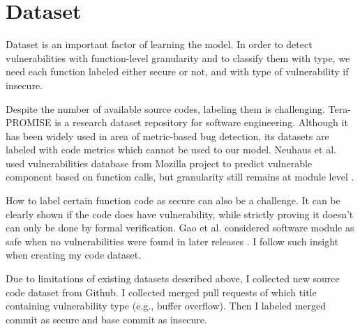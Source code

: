 \section{Dataset}
\label{section:dataset}

Dataset is an important factor of learning the model.
In order to detect vulnerabilities with function-level granularity and to classify them with type, we need each function labeled either secure or not, and with type of vulnerability if insecure.

Despite the number of available source codes, labeling them is challenging.
Tera-PROMISE \cite{promiserepo} is a research dataset repository for software engineering. Although it has been widely used in area of metric-based bug detection, its datasets are labeled with code metrics which cannot be used to our model.
Neuhaus et al. used vulnerabilities database from Mozilla project to predict vulnerable component based on function calls, but granularity still remains at module level \cite{neuhaus2007predicting}.

How to label certain function code as secure can also be a challenge.
It can be clearly shown if the code does have vulnerability, while strictly proving it doesn't can only be done by formal verification.
Gao et al. considered software module as safe when no vulnerabilities were found in later releases \cite{gao2011choosing}.
I follow such insight when creating my code dataset.

Due to limitations of existing datasets described above, I collected new source code dataset from Github.
I collected merged pull requests of which title containing vulnerability type (e.g., buffer overflow).
Then I labeled merged commit as secure and base commit as insecure.